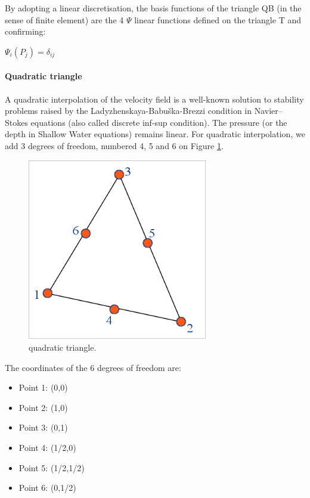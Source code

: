 By adopting a linear discretisation, the basis functions of the triangle QB (in
the sense of finite element) are the 4 $\Psi$ linear functions defined on the
triangle T and confirming:

$\Psi_{i}(P_{j})=\delta_{ij}$

\paragraph{Quadratic triangle}

A quadratic interpolation of the velocity field is a well-known solution to
stability problems raised by the Ladyzhenskaya-Babu\v{s}ka-Brezzi condition in
Navier--Stokes equations (also called discrete inf-sup condition). The pressure
(or the depth in Shallow Water equations) remains linear. For quadratic
interpolation, we add 3 degrees of freedom, numbered 4, 5 and 6 on Figure
\ref{fig:quadratic-triangle}.

\begin{figure}[H]%
\begin{center}
%
  \includegraphics[width=0.7\textwidth]{./graphics/quadratic-triangle}
%
\end{center}
\caption
{quadratic triangle.}
\label{fig:quadratic-triangle}
\end{figure}

The coordinates of the 6 degrees of freedom are:
\begin{itemize}
  \item Point 1: (0,0)
  \item Point 2: (1,0)
  \item Point 3: (0,1)
  \item Point 4: (1/2,0)
  \item Point 5: (1/2,1/2)
  \item Point 6: (0,1/2)
\end{itemize}

